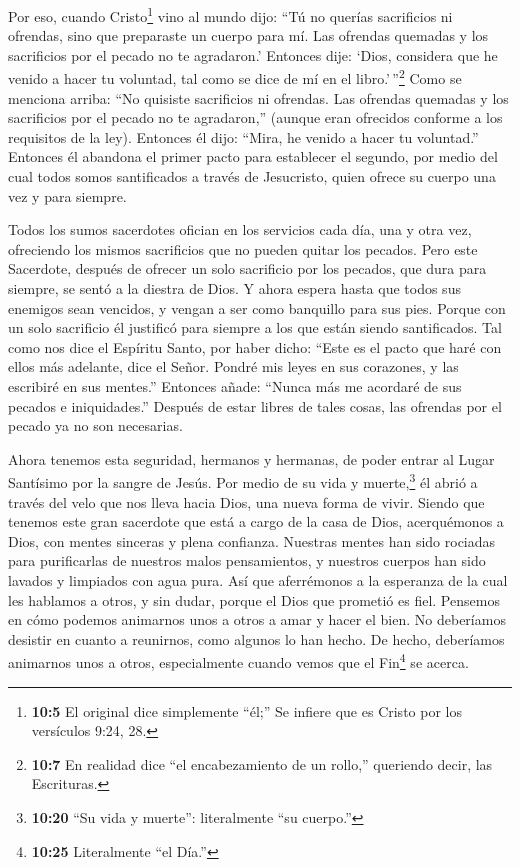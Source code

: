  Por eso, cuando Cristo\footnote{\textbf{10:5} El original
  dice simplemente ``él;'' Se infiere que es Cristo por los versículos
  9:24, 28.} vino al mundo dijo: ``Tú no querías sacrificios ni
ofrendas, sino que preparaste un cuerpo para mí.  Las
ofrendas quemadas y los sacrificios por el pecado no te agradaron.'
 Entonces dije: `Dios, considera que he venido a hacer tu
voluntad, tal como se dice de mí en el libro.'\,''\footnote{\textbf{10:7}
  En realidad dice ``el encabezamiento de un rollo,'' queriendo decir,
  las Escrituras.}  Como se menciona arriba: ``No quisiste
sacrificios ni ofrendas. Las ofrendas quemadas y los sacrificios por el
pecado no te agradaron,'' (aunque eran ofrecidos conforme a los
requisitos de la ley).  Entonces él dijo: ``Mira, he venido
a hacer tu voluntad.'' Entonces él abandona el primer pacto para
establecer el segundo,  por medio del cual todos somos
santificados a través de Jesucristo, quien ofrece su cuerpo una vez y
para siempre.

 Todos los sumos sacerdotes ofician en los servicios cada
día, una y otra vez, ofreciendo los mismos sacrificios que no pueden
quitar los pecados.  Pero este Sacerdote, después de
ofrecer un solo sacrificio por los pecados, que dura para siempre, se
sentó a la diestra de Dios.  Y ahora espera hasta que todos
sus enemigos sean vencidos, y vengan a ser como banquillo para sus pies.
 Porque con un solo sacrificio él justificó para siempre a
los que están siendo santificados.  Tal como nos dice el
Espíritu Santo, por haber dicho:  ``Este es el pacto que
haré con ellos más adelante, dice el Señor. Pondré mis leyes en sus
corazones, y las escribiré en sus mentes.'' Entonces añade:
 ``Nunca más me acordaré de sus pecados e iniquidades.''
 Después de estar libres de tales cosas, las ofrendas por
el pecado ya no son necesarias.

 Ahora tenemos esta seguridad, hermanos y hermanas, de
poder entrar al Lugar Santísimo por la sangre de Jesús. 
Por medio de su vida y muerte,\footnote{\textbf{10:20} ``Su vida y
  muerte'': literalmente ``su cuerpo.''} él abrió a través del velo que
nos lleva hacia Dios, una nueva forma de vivir.  Siendo que
tenemos este gran sacerdote que está a cargo de la casa de Dios,
 acerquémonos a Dios, con mentes sinceras y plena
confianza. Nuestras mentes han sido rociadas para purificarlas de
nuestros malos pensamientos, y nuestros cuerpos han sido lavados y
limpiados con agua pura.  Así que aferrémonos a la
esperanza de la cual les hablamos a otros, y sin dudar, porque el Dios
que prometió es fiel.  Pensemos en cómo podemos animarnos
unos a otros a amar y hacer el bien.  No deberíamos
desistir en cuanto a reunirnos, como algunos lo han hecho. De hecho,
deberíamos animarnos unos a otros, especialmente cuando vemos que el
Fin\footnote{\textbf{10:25} Literalmente ``el Día.''} se acerca.

